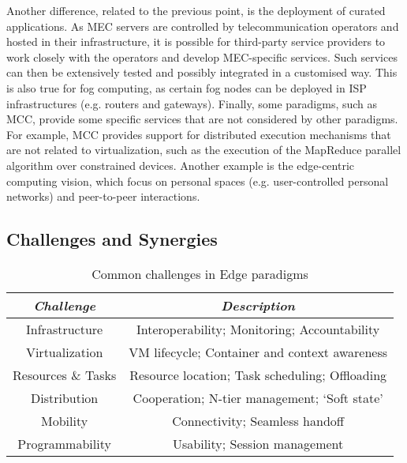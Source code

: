 \documentclass[twocolumn,preprint,3p]{elsarticle}
\begin{document}
Another difference, related to the previous point, is the deployment of curated applications. As MEC servers are controlled by telecommunication operators and hosted in their infrastructure, it is possible for third-party service providers to work closely with the operators and develop MEC-specific services. Such services can then be extensively tested and possibly integrated in a customised way. This is also true for fog computing, as certain fog nodes can be deployed in ISP infrastructures (e.g. routers and gateways). Finally, some paradigms, such as MCC, provide some specific services that are not considered by other paradigms. For example, MCC provides support for distributed execution mechanisms that are not related to virtualization, such as the execution of the MapReduce parallel algorithm over constrained devices. Another example is the edge-centric computing vision, which focus on personal spaces (e.g. user-controlled personal networks) and peer-to-peer interactions.

\subsection{Challenges and Synergies}
\label{feat_syn::chasyn}

\begin{table*}[!htb]
\centering
\begin{footnotesize}
\begin{tabular}{|c|c|}
  \hline
  \textit{Challenge} & \textit{Description} \\
  \hline
  Infrastructure & Interoperability; Monitoring; Accountability \\
  \hline
  Virtualization & VM lifecycle; Container and context awareness \\
  \hline
  Resources \& Tasks & Resource location; Task scheduling; Offloading \\
  \hline
  Distribution & Cooperation; N-tier management; `Soft state' \\
  \hline
  Mobility & Connectivity; Seamless handoff \\
  \hline
  Programmability & Usability; Session management \\
  \hline
\end{tabular}
\end{footnotesize}
\caption{Common challenges in Edge paradigms}\label{T:ChEdge}
\end{table*}
\end{document}
